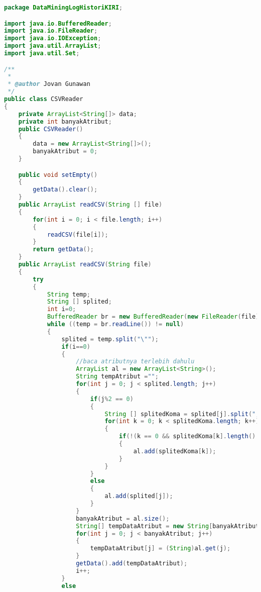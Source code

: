 \begin{lstlisting}[language=Java,basicstyle=\tiny,caption=CSVReader.java]
package DataMiningLogHistoriKIRI;

import java.io.BufferedReader;
import java.io.FileReader;
import java.io.IOException;
import java.util.ArrayList;
import java.util.Set;

/**
 *
 * @author Jovan Gunawan
 */
public class CSVReader
{
    private ArrayList<String[]> data;
    private int banyakAtribut;
    public CSVReader() 
    {
        data = new ArrayList<String[]>();
        banyakAtribut = 0;
    }

    public void setEmpty()
    {
        getData().clear();
    }
    public ArrayList readCSV(String [] file)
    {
        for(int i = 0; i < file.length; i++)
        {
            readCSV(file[i]);
        }
        return getData();
    }
    public ArrayList readCSV(String file)
    {
        try
        {
            String temp;
            String [] splited;
            int i=0;
            BufferedReader br = new BufferedReader(new FileReader(file));
            while ((temp = br.readLine()) != null)
            {
                splited = temp.split("\"");
                if(i==0)
                {
                    //baca atributnya terlebih dahulu
                    ArrayList al = new ArrayList<String>();
                    String tempAtribut ="";
                    for(int j = 0; j < splited.length; j++)
                    {
                        if(j%2 == 0)
                        {
                            String [] splitedKoma = splited[j].split(",");
                            for(int k = 0; k < splitedKoma.length; k++)
                            {
                                if(!(k == 0 && splitedKoma[k].length() ==0)||(k==splitedKoma.length-1 && splitedKoma[k].length() == 0))
                                {
                                    al.add(splitedKoma[k]);
                                }
                            }
                        }
                        else
                        {
                            al.add(splited[j]);
                        }
                    }
                    banyakAtribut = al.size();
                    String[] tempDataAtribut = new String[banyakAtribut];
                    for(int j = 0; j < banyakAtribut; j++)
                    {
                        tempDataAtribut[j] = (String)al.get(j);
                    }
                    getData().add(tempDataAtribut);
                    i++;
                }
                else

\end{lstlisting}
